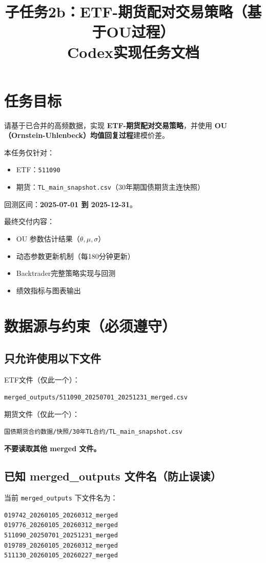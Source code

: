 \documentclass[11pt]{article}
\title{子任务2b：ETF-期货配对交易策略（基于OU过程）\\Codex实现任务文档}
\author{}
\date{}
\begin{document}
\maketitle

\section{任务目标}
请基于已合并的高频数据，实现 \textbf{ETF-期货配对交易策略}，并使用 \textbf{OU（Ornstein-Uhlenbeck）均值回复过程}建模价差。

本任务仅针对：
\begin{itemize}
  \item ETF：\texttt{511090}
  \item 期货：\texttt{TL\_main\_snapshot.csv}（30年期国债期货主连快照）
\end{itemize}

回测区间：\textbf{2025-07-01 到 2025-12-31}。

最终交付内容：
\begin{itemize}
  \item OU 参数估计结果（$\theta,\mu,\sigma$）
  \item 动态参数更新机制（每180分钟更新）
  \item Backtrader完整策略实现与回测
  \item 绩效指标与图表输出
\end{itemize}

\section{数据源与约束（必须遵守）}
\subsection{只允许使用以下文件}
ETF文件（仅此一个）：
\begin{lstlisting}
merged_outputs/511090_20250701_20251231_merged.csv
\end{lstlisting}

期货文件（仅此一个）：
\begin{lstlisting}
国债期货合约数据/快照/30年TL合约/TL_main_snapshot.csv
\end{lstlisting}

\textbf{不要读取其他 merged 文件。}

\subsection{已知 merged\_outputs 文件名（防止误读）}
当前 \texttt{merged\_outputs} 下文件名为：
\begin{lstlisting}
019742_20260105_20260312_merged
019776_20260105_20260312_merged
511090_20250701_20251231_merged
019789_20260105_20260312_merged
511130_20260105_20260227_merged
\end{lstlisting}
\end{document}
